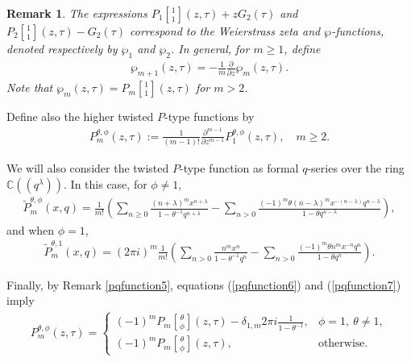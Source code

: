 \documentclass[9pt]{amsart}
\newtheorem{remark}{Remark}[section]
\begin{document}
\begin{remark}\label{weirstrasswp}
The expressions $P_{1}\genfrac[]{0pt}{0}{1}{1}(z,\tau)+zG_2(\tau)$ and $P_2\genfrac[]{0pt}{0}{1}{1}(z,\tau)-G_2(\tau)$ correspond to the Weierstrass zeta and $\wp$-functions, denoted respectively by $\wp_1$ and $\wp_2$. In general, for $m\geq 1$, define
\begin{align}
    \wp_{m+1}(z,\tau)=-\frac{1}{m} \frac{\partial}{\partial z}\wp_m(z,\tau).
\end{align}
Note that $\wp_m(z,\tau)=P_m\genfrac[]{0pt}{0}{1}{1}(z,\tau)$ for $m>2$.
\end{remark}

Define also the higher twisted $P$-type functions by
\begin{align}\label{pqfunction7}
    P_{m}^{\theta,\phi}(z,\tau):=\frac{1}{(m-1)!} \frac{\partial^{m-1}}{\partial z^{m-1}} P_{1}^{\theta,\phi}(z,\tau), \quad m\geq 2.
\end{align}

We will also consider the twisted $P$-type function as formal $q$-series over the ring $\mathbb{C}((q^{\lambda}))$. In this case, for $\phi \neq 1$,
\begin{align}
\tilde{P}_{m}^{\theta,\phi}(x,q)=\frac{1}{m!}\left(\sum_{n\geq 0}\frac{(n+\lambda)^{m}x^{n+\lambda}}{1-\theta^{-1} q^{n+\lambda}} - \sum_{n>0} \frac{(-1)^{m} \theta (n-\lambda)^{m} x^{-(n-\lambda)} q^{n-\lambda}}{1-\theta q^{n-\lambda}}\right),
\end{align}
and when $\phi=1$,
\begin{align}\label{pqfunction8}
\tilde{P}_{m}^{\theta,1}(x,q)= (2 \pi i )^{m} \frac{1}{m!} \left( \sum_{n>0} \frac{n^{m}x^{n}}{1-\theta^{-1} q^{n}} - \sum_{n>0} \frac{(-1)^{m} \theta n^{m} x^{-n} q^{n}}{1-\theta q^{n}} \right).
\end{align}

Finally, by Remark \ref{pqfunction5}, equations (\ref{pqfunction6}) and (\ref{pqfunction7}) imply
\begin{align}\label{pqfunction71}
    P_{m}^{\theta,\phi}(z,\tau)=\begin{cases}
            (-1)^{m} P_{m}\genfrac[]{0pt}{0}{\theta}{\phi}(z,\tau) - \delta_{1,m} 2\pi i\frac{1}{1-\theta^{-1}},   & \phi=1,\ \theta\neq 1,\\
            (-1)^{m} P_{m}\genfrac[]{0pt}{0}{\theta}{\phi}(z,\tau),                                             & \text{otherwise}.
    \end{cases}
\end{align}









\appendix



\end{document}
